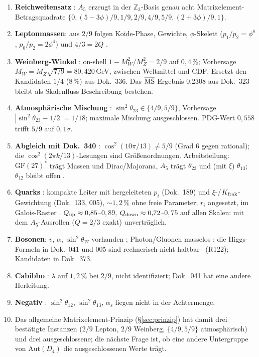 \begin{enumerate}
\item \textbf{Reichweitensatz} \BM: $A_5$ erzeugt in der $\mathbb Z_3$-Basis
  genau acht Matrixelement-Betragsquadrate
  $\{0, (5-3\phi)/9, 1/9, 2/9, 4/9, 5/9, (2+3\phi)/9, 1\}$.
\item \textbf{Leptonmassen}: aus $2/9$ folgen Koide-Phase, Gewichte,
  $\phi$-Skelett ($p_1/p_2 = \phi^8$, $p_0/p_2 = 2\phi^4$) und $4/3 = 2Q$ \BM.
\item \textbf{Weinberg-Winkel} \KM: on-shell $1-M_W^2/M_Z^2 = 2/9$ auf
  $0{,}4\,\%$; Vorhersage $M_W = M_Z\sqrt{7/9} = 80{,}420$\,GeV, zwischen
  Weltmittel und CDF. Ersetzt den Kandidaten $1/4$ (8\,\%) aus Dok.~336.
  Das $\overline{\rm MS}$-Ergebnis 0{,}2308 aus Dok.~323 bleibt als
  Skalenfluss-Beschreibung bestehen.
\item \textbf{Atmosphärische Mischung} \KM: $\sin^2\theta_{23}\in\{4/9,5/9\}$,
  Vorhersage $|\sin^2\theta_{23}-1/2| = 1/18$; maximale Mischung ausgeschlossen.
  PDG-Wert $0{,}558$ trifft $5/9$ auf $0{,}1\sigma$.
\item \textbf{Abgleich mit Dok.~340} \BM: $\cos^2(10\pi/13)\ne 5/9$
  (Grad 6 gegen rational); die $\cos^2(2\pi k/13)$-Lesungen sind
  Größenordnungen. Arbeitsteilung: $\mathrm{GF}(27)^*$ trägt Massen und
  Dirac/Majorana, $A_5$ trägt $\theta_{23}$ und (mit $\xi$) $\theta_{13}$;
  $\theta_{12}$ bleibt offen \SM.
\item \textbf{Quarks} \XM: kompakte Leiter mit hergeleiteten $p_i$
  (Dok.~189) und $\xi$-/$K_{\rm frak}$-Gewichtung (Dok.~133, 005),
  $\sim1{,}2\,\%$ ohne freie Parameter; $r_i$ angesetzt, im Galois-Raster
  \BM. $Q_{\rm up}\approx0{,}85$--$0{,}89$, $Q_{\rm down}\approx0{,}72$--$0{,}75$
  auf allen Skalen: mit dem $A_5$-Ausrollen ($Q = 2/3$ exakt) unverträglich.
\item \textbf{Bosonen}: $v$, $\alpha$, $\sin^2\theta_W$ vorhanden \KM;
  Photon/Gluonen masselos \BM; die Higgs-Formeln in Dok.~041 und 005 sind
  rechnerisch nicht haltbar \XM~(R122); Kandidaten in Dok.~373.
\item \textbf{Cabibbo} \SM: $\lambda$ auf $1{,}2\,\%$ bei $2/9$, nicht
  identifiziert; Dok.~041 hat eine andere Herleitung.
\item \textbf{Negativ} \XM: $\sin^2\theta_{12}$, $\sin^2\theta_{13}$,
  $\alpha_s$ liegen nicht in der Achtermenge.
\item Das allgemeine Matrixelement-Prinzip (§\ref{sec:prinzip}) hat damit
  drei bestätigte Instanzen ($2/9$ Lepton, $2/9$ Weinberg, $\{4/9,5/9\}$
  atmosphärisch) und drei ausgeschlossene; die nächste Frage ist, ob eine
  andere Untergruppe von $\mathrm{Aut}(D_4)$ die ausgeschlossenen Werte trägt.
\end{enumerate}

